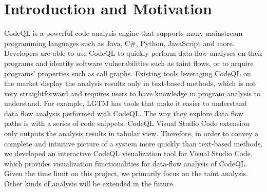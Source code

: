 \documentclass[sigplan,10pt,review]{acmart}
\begin{document}




\maketitle


\section{Introduction and Motivation}
CodeQL is a powerful code analysis engine that supports many mainstream programming languages such as Java, C\#, Python, JavaScript and more. Developers are able to use CodeQL to quickly perform data-flow analyses on their programs and identity software vulnerabilities such as taint flows, or to acquire programs' properties such as call graphs. 
\newline
\indent Existing tools leveraging CodeQL on the market display the analysis results only in text-based methods, which is not very straightforward and requires users to have knowledge in program analysis to understand. For example, LGTM has tools that make it easier to understand data flow analysis performed with CodeQL. The way they explore data flow paths is with a series of code snippets. CodeQL Visual Studio Code extension only outputs the analysis results in tabular view.
\newline
\indent Therefore, in order to convey a complete and intuitive picture of a system more quickly than text-based methods, we developed an interactive CodeQL visualization tool for Visual Studio Code, which provides visualization functionalities for data-flow analysis of CodeQL. Given the time limit on this project, we primarily focus on the taint analysis. Other kinds of analysis will be extended in the future.
\end{document}
